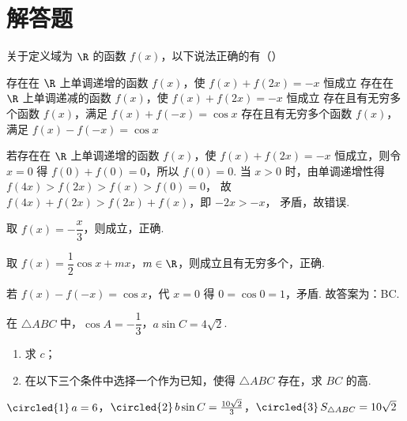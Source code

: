 \documentclass[UTF8,a4paper,oneside,11pt]{ctexbook}
\begin{document}
\section{解答题}

\begin{problem}
关于定义域为 \(\R\) 的函数 \(f(x)\)，以下说法正确的有（\quad）

\choices
    {存在在 \(\R\) 上单调递增的函数 \(f(x)\)，使 \(f(x)+f(2x)=-x\) 恒成立}
    {存在在 \(\R\) 上单调递减的函数 \(f(x)\)，使 \(f(x)+f(2x)=-x\) 恒成立}
    {存在且有无穷多个函数 \(f(x)\)，满足 \(f(x)+f(-x)=\cos x\)}
    {存在且有无穷多个函数 \(f(x)\)，满足 \(f(x)-f(-x)=\cos x\)}
\end{problem}

\begin{solution}
若存在在 \(\R\) 上单调递增的函数 \(f(x)\)，使 \(f(x)+f(2x)=-x\) 恒成立，则令 \(x=0\) 得 \(f(0)+f(0)=0\)，所以 \(f(0)=0\).
当 \(x>0\) 时，由单调递增性得
\(
f(4x)>f(2x)>f(x)>f(0)=0
\)，
故 \(f(4x)+f(2x)>f(2x)+f(x)\)，即 \(-2x>-x\)，
矛盾，故错误.

取 \(f(x)=-\dfrac{x}{3}\)，则成立，正确.

取 \(f(x)=\dfrac{1}{2}\cos x+mx\)，\(m\in\R\)，则成立且有无穷多个，正确.

若 \(f(x)-f(-x)=\cos x\)，代 \(x=0\) 得 \(0=\cos 0=1\)，矛盾. 故答案为：BC.
\end{solution}

\begin{problem}
在 \(\triangle ABC\) 中，\(\cos A=-\dfrac13\)，\(a\sin C=4\sqrt2\).

\begin{enumerate}
\item 求 \(c\)；

\item 在以下三个条件中选择一个作为已知，使得 \(\triangle ABC\) 存在，求 \(BC\) 的高.
\end{enumerate}

\(\text{\circled{1}} \, a=6\)，\(\text{\circled{2}} \, b\sin C= \frac{10\sqrt2}{3}\)，\(\text{\circled{3}} \, S_{\triangle ABC}=10\sqrt2\)
\end{problem}
\end{document}
